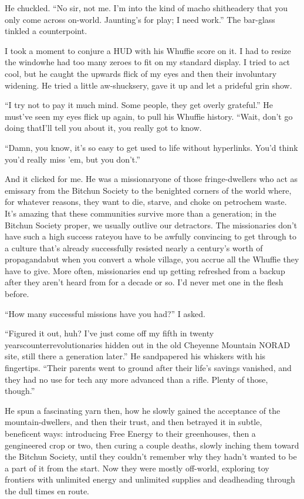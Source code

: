 He chuckled. “No sir, not me. I'm into the kind of macho
shitheadery that you only come across on-world. Jaunting's for
play; I need work.” The bar-glass tinkled a counterpoint.

I took a moment to conjure a HUD with his Whuffie score on it. I
had to resize the window{\dash}he had too many zeroes to fit on my
standard display. I tried to act cool, but he caught the upwards
flick of my eyes and then their involuntary widening. He tried a
little aw-shucksery, gave it up and let a prideful grin show.

“I try not to pay it much mind. Some people, they get overly
grateful.” He must've seen my eyes flick up again, to pull his
Whuffie history. “Wait, don't go doing that{\dash}I'll tell you about it,
you really got to know.

“Damn, you know, it's so easy to get used to life without
hyperlinks. You'd think you'd really miss 'em, but you don't.”

And it clicked for me. He was a missionary{\dash}one of those
fringe-dwellers who act as emissary from the Bitchun Society to the
benighted corners of the world where, for whatever reasons, they
want to die, starve, and choke on petrochem waste. It's amazing
that these communities survive more than a generation; in the
Bitchun Society proper, we usually outlive our detractors. The
missionaries don't have such a high success rate{\dash}you have to be
awfully convincing to get through to a culture that's already
successfully resisted nearly a century's worth of propaganda{\dash}but
when you convert a whole village, you accrue all the Whuffie they
have to give. More often, missionaries end up getting refreshed
from a backup after they aren't heard from for a decade or so. I'd
never met one in the flesh before.

“How many successful missions have you had?” I asked.

“Figured it out, huh? I've just come off my fifth in twenty
years{\dash}counterrevolutionaries hidden out in the old Cheyenne
Mountain NORAD site, still there a generation later.” He
sandpapered his whiskers with his fingertips. “Their parents went
to ground after their life's savings vanished, and they had no use
for tech any more advanced than a rifle. Plenty of those, though.”

He spun a fascinating yarn then, how he slowly gained the
acceptance of the mountain-dwellers, and then their trust, and then
betrayed it in subtle, beneficent ways: introducing Free Energy to
their greenhouses, then a gengineered crop or two, then curing a
couple deaths, slowly inching them toward the Bitchun Society,
until they couldn't remember why they hadn't wanted to be a part of
it from the start. Now they were mostly off-world, exploring toy
frontiers with unlimited energy and unlimited supplies and
deadheading through the dull times en route.

